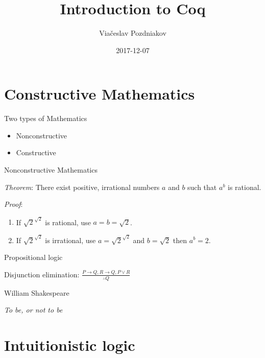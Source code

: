 \documentclass[17pt]{beamer}
\author{Viačeslav Pozdniakov}
\title{Introduction to Coq}
\date{2017-12-07}
\begin{document}
\begin{frame}
\titlepage
\end{frame}

\begin{frame}
\tableofcontents
\end{frame}

\section{Constructive Mathematics}

\begin{frame}{Two types of Mathematics}

\begin{itemize}
  \item Nonconstructive
  \item Constructive
\end{itemize}

\end{frame}

\begin{frame}{Nonconstructive Mathematics}

\emph{Theorem}: There exist positive, irrational numbers $a$ and $b$ such that $a^b$ is rational.

\emph{Proof}:

\begin{enumerate}
  \item If $\sqrt{2}^{\sqrt{2}}$ is rational, use $a = b = \sqrt{2}$.
  \item If $\sqrt{2}^{\sqrt{2}}$ is irrational, use $a = \sqrt{2}^{\sqrt{2}}$ and $b = \sqrt{2}$ then $a^b = 2$.
\end{enumerate}

\end{frame}

\begin{frame}{Propositional logic}

\begin{center}
Disjunction elimination:
$\frac{P\to Q,R\to Q,P\lor R}{\therefore Q}$
\end{center}
\end{frame}

\begin{frame}{William Shakespeare}
\begin{center}
\emph{To be, or not to be}
\end{center}
\end{frame}

\section{Intuitionistic logic}
\end{document}
